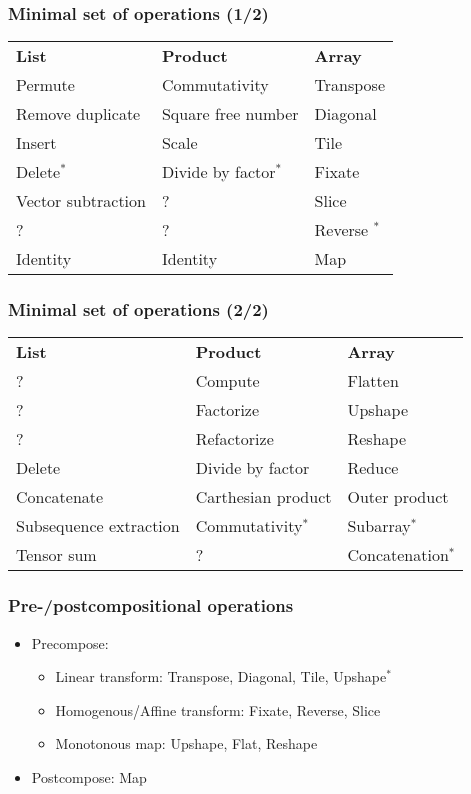 \documentclass[xetex,mathserif,serif]{beamer}
\begin{document}
\begin{frame}
  \frametitle{Minimal set of operations (1/2)}
  \pause
  \footnotesize
  \begin{center}
    \begin{tabular}{lll}
      \bfseries List & \bfseries Product & \bfseries Array  \pause\\
      Permute \pause& Commutativity  \pause& Transpose  \pause\\
      Remove duplicate \pause& Square free number  \pause& Diagonal  \pause\\
      Insert \pause& Scale  \pause& Tile  \pause\\
      Delete$^*$ \pause& Divide by factor$^*$  \pause& Fixate  \pause\\
      Vector subtraction \pause& ?  \pause& Slice  \pause\\
      ? & ? & Reverse $^*$  \pause\\
      Identity & Identity & Map 
    \end{tabular}
  \end{center}
\end{frame}

\begin{frame}
  \frametitle{Minimal set of operations (2/2)}
  \pause
  \footnotesize
  \begin{center}
    \begin{tabular}{lll}
      \bfseries List & \bfseries Product & \bfseries Array  \pause\\
      ? & Compute \pause& Flatten \pause\\
      ? & Factorize \pause& Upshape \pause\\
      ? & Refactorize \pause& Reshape \pause\\
      Delete \pause& Divide by factor \pause& Reduce \pause\\
      Concatenate \pause& Carthesian product \pause& Outer product \pause\\
      Subsequence extraction \pause& Commutativity$^*$ \pause& Subarray$^*$ \pause\\
      Tensor sum & ? \pause& Concatenation$^*$
    \end{tabular}
  \end{center}
\end{frame}

\begin{frame}
  \frametitle{Pre-/postcompositional operations}
  \pause
  \begin{itemize}[<+->]
    \item Precompose:
    \begin{itemize}[<+->]
      \item Linear transform: Transpose, Diagonal, Tile, Upshape$^*$
      \item Homogenous/Affine transform: Fixate, Reverse, Slice
      \item Monotonous map: Upshape, Flat, Reshape
    \end{itemize}
    \item Postcompose: Map
  \end{itemize}
\end{frame}
\end{document}
